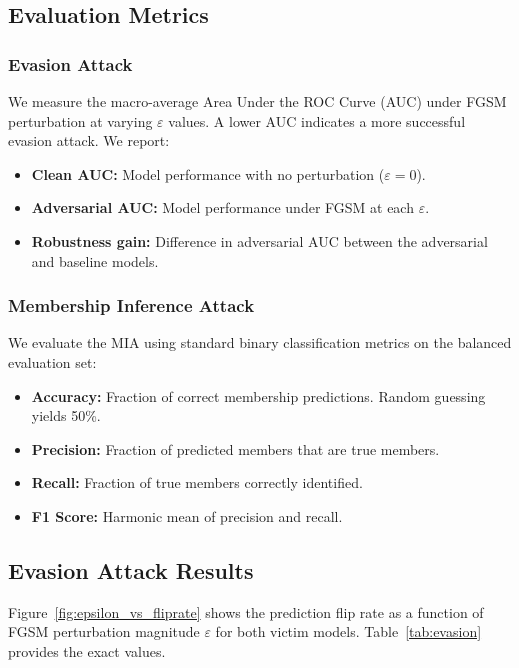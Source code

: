 \documentclass[conference]{IEEEtran}
\begin{document}
\subsection{Evaluation Metrics}

\subsubsection{Evasion Attack}
We measure the macro-average Area Under the ROC Curve (AUC) under FGSM perturbation at varying $\varepsilon$ values. A lower AUC indicates a more successful evasion attack. We report:
\begin{itemize}[leftmargin=*]
    \item \textbf{Clean AUC:} Model performance with no perturbation ($\varepsilon = 0$).
    \item \textbf{Adversarial AUC:} Model performance under FGSM at each $\varepsilon$.
    \item \textbf{Robustness gain:} Difference in adversarial AUC between the adversarial and baseline models.
\end{itemize}

\subsubsection{Membership Inference Attack}
We evaluate the MIA using standard binary classification metrics on the balanced evaluation set:
\begin{itemize}[leftmargin=*]
    \item \textbf{Accuracy:} Fraction of correct membership predictions. Random guessing yields 50\%.
    \item \textbf{Precision:} Fraction of predicted members that are true members.
    \item \textbf{Recall:} Fraction of true members correctly identified.
    \item \textbf{F1 Score:} Harmonic mean of precision and recall.
\end{itemize}



\subsection{Evasion Attack Results}

Figure~\ref{fig:epsilon_vs_fliprate} shows the prediction flip rate as a function of FGSM perturbation magnitude $\varepsilon$ for both victim models. Table~\ref{tab:evasion} provides the exact values.
\end{document}
